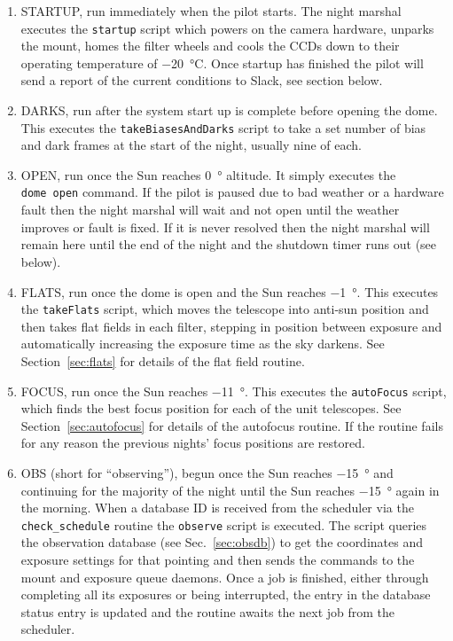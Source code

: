 \begin{colsection}
\begin{colsection}
\begin{enumerate}

\item STARTUP, run immediately when the pilot starts. The night marshal executes the \texttt{startup} script which powers on the camera hardware, unparks the mount, homes the filter wheels and cools the CCDs down to their operating temperature of \SI{-20}{\celsius}. Once startup has finished the pilot will send a report of the current conditions to Slack, see section below.

\item DARKS, run after the system start up is complete before opening the dome. This executes the \texttt{takeBiasesAndDarks} script to take a set number of bias and dark frames at the start of the night, usually nine of each.

\item OPEN, run once the Sun reaches \SI{0}{\degree} altitude. It simply executes the \texttt{dome~open} command. If the pilot is paused due to bad weather or a hardware fault then the night marshal will wait and not open until the weather improves or fault is fixed. If it is never resolved then the night marshal will remain here until the end of the night and the shutdown timer runs out (see below).

\item FLATS, run once the dome is open and the Sun reaches \SI{-1}{\degree}. This executes the \texttt{takeFlats} script, which moves the telescope into anti-sun position and then takes flat fields in each filter, stepping in position between exposure and automatically increasing the exposure time as the sky darkens. See Section~\ref{sec:flats} for details of the flat field routine.

\item FOCUS, run once the Sun reaches \SI{-11}{\degree}. This executes the \texttt{autoFocus} script, which finds the best focus position for each of the unit telescopes. See Section~\ref{sec:autofocus} for details of the autofocus routine. If the routine fails for any reason the previous nights' focus positions are restored.

\item OBS (short for ``observing''), begun once the Sun reaches \SI{-15}{\degree} and continuing for the majority of the night until the Sun reaches \SI{-15}{\degree} again in the morning. When a database ID is received from the scheduler via the \texttt{check\_schedule} routine the \texttt{observe} script is executed. The script queries the observation database (see Sec.~\ref{sec:obsdb}) to get the coordinates and exposure settings for that pointing and then sends the commands to the mount and exposure queue daemons. Once a job is finished, either through completing all its exposures or being interrupted, the entry in the database status entry is updated and the routine awaits the next job from the scheduler.


\end{enumerate}
\end{colsection}
\end{colsection}
